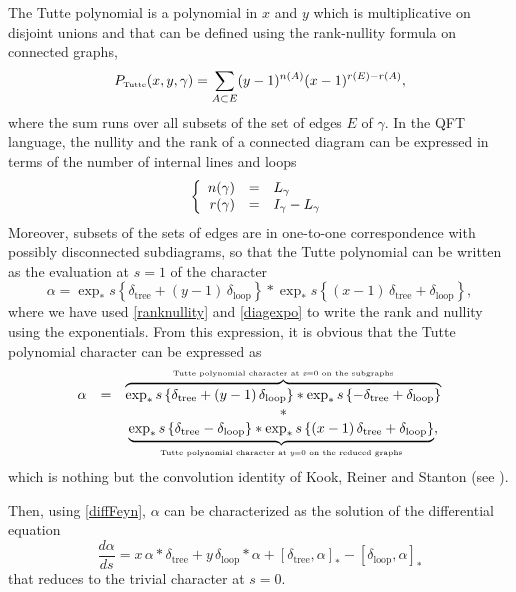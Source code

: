 \documentclass[10pt,here,feynmf]{article}
\begin{document}
The Tutte polynomial  is a polynomial in $x$ and $y$ which is multiplicative on disjoint unions and that can be defined using the rank-nullity formula on connected graphs, 
\begin{equation}
P_{\mbox{\tiny Tutte}}(x,y,\gamma)=\sum_{A\subset E}(y-1)^{n(A)}(x-1)^{r(E)-r(A)},
\end{equation}
where the sum runs over all subsets of the set of edges $E$ of $\gamma$. In the QFT language, the nullity  and the rank of a connected diagram can be expressed in terms of the number of internal lines and loops
\begin{equation}
\left\{
\begin{array}{rcl}
n(\gamma)&=&L_{\gamma}\cr
r(\gamma)&=&I_{\gamma}-L_{\gamma}
\end{array}
\label{ranknullity}
\right.
\end{equation}
Moreover, subsets of the sets of edges are in one-to-one correspondence with possibly disconnected subdiagrams, so that the Tutte polynomial can be written as the evaluation at $s=1$ of the character
\begin{equation}
\alpha=\exp_{\ast}s\left\{\delta_{\mathrm{tree}}+(y-1)\,\delta_{\mathrm{loop}}\right\}\ast
\exp_{\ast}s\left\{(x-1)\,\delta_{\mathrm{tree}}+\delta_{\mathrm{loop}}\right\},
\label{tutteprod}
\end{equation}
where we have used \eqref{ranknullity} and \eqref{diagexpo} to write the rank and nullity using the exponentials. From this expression, it is obvious that the Tutte polynomial character can be expressed as
\begin{equation}
\begin{array}{lcc}
\alpha&=&\overbrace{\exp_{\ast}s\left\{\delta_{\mathrm{tree}}+(y-1)\,\delta_{\mathrm{loop}}\right\}\ast
\exp_{\ast}s\left\{-\delta_{\mathrm{tree}}+\delta_{\mathrm{loop}}\right\}}^{\mbox{\tiny Tutte polynomial character at {\it x}=0 on the subgraphs}}\cr
&&\ast\cr
&&
\underbrace{\exp_{\ast}s\left\{\delta_{\mathrm{tree}}-\delta_{\mathrm{loop}}\right\}\ast
\exp_{\ast}s\left\{(x-1)\,\delta_{\mathrm{tree}}+\delta_{\mathrm{loop}}\right\}}_{\mbox{\tiny Tutte polynomial character at {\it y}=0 on the reduced graphs}},
\end{array}
\end{equation}
which is nothing but the convolution identity of Kook, Reiner and Stanton (see \cite{KRS}).

Then, using \eqref{diffFeyn}, $\alpha$ can be characterized as the solution of the differential equation
\begin{equation}
\frac{d\alpha}{ds}
=x\,\alpha\ast\delta_{\mathrm{tree}}
+y\,\delta_{\mathrm{loop}}\ast\alpha
+\left[\delta_{\mathrm{tree}},\alpha\right]_{\ast}
-\left[\delta_{\mathrm{loop}},\alpha\right]_{\ast}
\label{difftutte}
\end{equation}
that reduces to the trivial character at $s=0$. 
\end{document}
